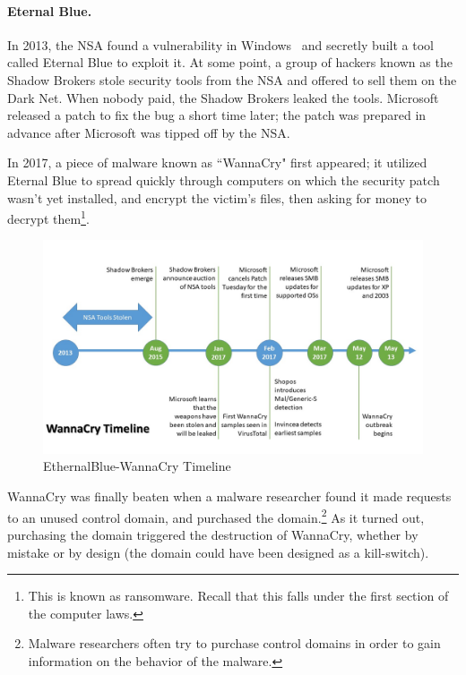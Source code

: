 \paragraph{Eternal Blue.} In 2013, the NSA found a vulnerability in Windows~\cite{CVE-2017-0144} and secretly built a tool called Eternal Blue to exploit it. At some point, a group of hackers known as the Shadow Brokers stole security tools from the NSA and offered to sell them on the Dark Net. When nobody paid, the Shadow Brokers leaked the tools. Microsoft released a patch to fix the bug a short time later; the patch was prepared in advance after Microsoft was tipped off by the NSA.

In 2017, a piece of malware known as ``WannaCry" first appeared; it utilized Eternal Blue to spread quickly through computers on which the security patch wasn't yet installed, and encrypt the victim's files, then asking for money to decrypt them\footnote{This is known as ransomware. Recall that this falls under the first section of the computer laws.}.

\begin{figure}[!ht]
    \centering
    \includegraphics[width=\textwidth]{images/EthernalBlue-WannaCry_Timeline.jpg}
    \caption{EthernalBlue-WannaCry Timeline} \label{fig:wannacry_timeline}
\end{figure}

WannaCry was finally beaten when a malware researcher found it made requests to an unused control domain, and purchased the domain.\footnote{Malware researchers often try to purchase control domains in order to gain information on the behavior of the malware.} As it turned out, purchasing the domain triggered the destruction of WannaCry, whether by mistake or by design (the domain could have been designed as a kill-switch).

